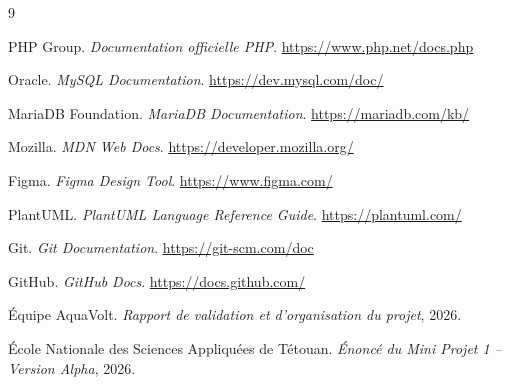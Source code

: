 \renewcommand{\refname}{Bibliographie}
\begin{thebibliography}{9}

PHP Group.
\textit{Documentation officielle PHP}.
\url{https://www.php.net/docs.php}

Oracle.
\textit{MySQL Documentation}.
\url{https://dev.mysql.com/doc/}

MariaDB Foundation.
\textit{MariaDB Documentation}.
\url{https://mariadb.com/kb/}

Mozilla.
\textit{MDN Web Docs}.
\url{https://developer.mozilla.org/}

Figma.
\textit{Figma Design Tool}.
\url{https://www.figma.com/}

PlantUML.
\textit{PlantUML Language Reference Guide}.
\url{https://plantuml.com/}

Git.
\textit{Git Documentation}.
\url{https://git-scm.com/doc}

GitHub.
\textit{GitHub Docs}.
\url{https://docs.github.com/}

Équipe AquaVolt.
\textit{Rapport de validation et d'organisation du projet}, 2026.

École Nationale des Sciences Appliquées de Tétouan.
\textit{Énoncé du Mini Projet 1 -- Version Alpha}, 2026.

\end{thebibliography}
